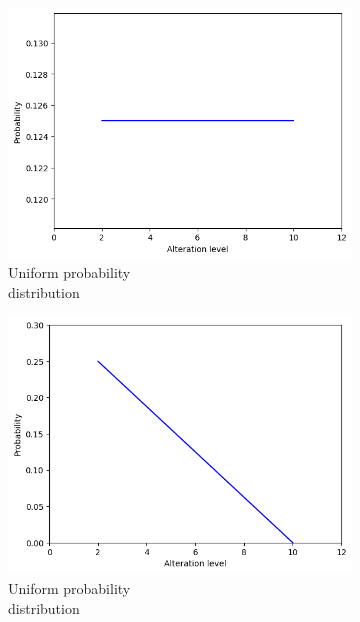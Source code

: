 \begin{figure}[h]
	\centering
	\begin{subfigure}{.33\textwidth}
		\centering
		\includegraphics[width=0.9\linewidth]{ImageFiles/ANNRob/unifo_prob}
		\caption{Uniform probability \\ distribution}
		\label{fig:unifo_prob}
	\end{subfigure}%
	\begin{subfigure}{.33\textwidth}
		\centering
		\includegraphics[width=0.9\linewidth]{ImageFiles/ANNRob/lin_prob}
		\caption{Uniform probability \\ distribution}
		\label{fig:lin_prob}
	\end{subfigure}%
	\begin{subfigure}{.33\textwidth}
		\centering

\end{subfigure}
\end{figure}
